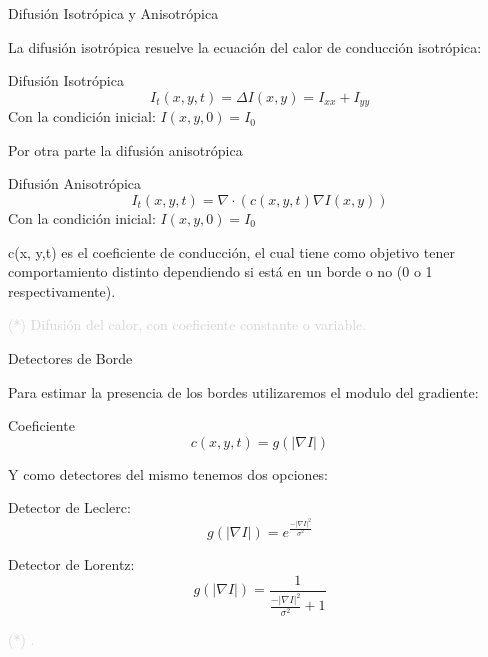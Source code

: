 \documentclass{beamer}
\begin{document}
\begin{frame}[fragile]{Difusión Isotrópica y Anisotrópica}
	\justifying
	
	La difusión isotrópica resuelve la ecuación del calor de conducción isotrópica:
	
	\begin{block}{Difusión Isotrópica}
		\[
		I_t(x,y,t) = \Delta I(x,y) = I_{xx} + I_{yy}
		\]
		Con la condición inicial: $I(x,y,0) = I_0$
	\end{block}
	
	Por otra parte la difusión anisotrópica
	
	\begin{block}{Difusión Anisotrópica}
		\[
		I_t(x,y,t) = \nabla \cdot (c(x,y,t) \nabla I(x,y))
		\]
		Con la condición inicial: $I(x,y,0) = I_0$
	\end{block}
	
	 c(x, y,t) es el coeficiente de conducción, el cual tiene como objetivo tener comportamiento distinto dependiendo si está en un borde o no (0 o 1 respectivamente).
	
	\vfill
	\footnotesize \textcolor{lightgray}{(*) Difusión del calor, con coeficiente constante o variable.}
\end{frame}

\begin{frame}[fragile]{Detectores de Borde}
	\justifying
	
	Para estimar la presencia de los bordes utilizaremos el modulo del gradiente:
	
	\begin{block}{Coeficiente}
		\[
		c(x,y,t) = g(|\nabla I|)
		\]
	\end{block}
	
	Y como detectores del mismo tenemos dos opciones:
	
	\begin{block}{Detector de Leclerc:}
		\[
		g(|\nabla I|) = e^{\frac{-|\nabla I|^2}{\sigma^2}}
		\]
	\end{block}
	
	\begin{block}{Detector de Lorentz:}
		\[
		g(|\nabla I|) = \frac{1}{\frac{-|\nabla I|^2}{\sigma^2}+1}
		\]
	\end{block}
	
	\vfill
	\footnotesize \textcolor{lightgray}{(*) .}
\end{frame}
\end{document}
